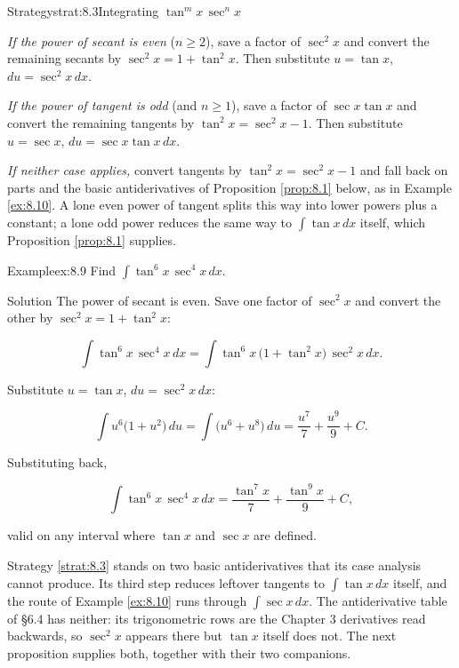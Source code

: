 \documentclass[a4paper,12pt,oneside]{memoir}
\begin{document}
\begin{envstrategy}{Strategy}{strat:8.3}{Integrating \(\tan^m x\,\sec^n x\)}
\begin{steps}
  \item \emph{If the power of secant is even} (\(n \ge 2\)), save a factor of \(\sec^{2}x\) and convert the remaining secants by \(\sec^{2}x = 1 + \tan^{2}x\). Then substitute \(u = \tan x\), \(du = \sec^{2}x\,dx\).
  \item \emph{If the power of tangent is odd} (and \(n \ge 1\)), save a factor of \(\sec x\tan x\) and convert the remaining tangents by \(\tan^{2}x = \sec^{2}x - 1\). Then substitute \(u = \sec x\), \(du = \sec x\tan x\,dx\).
  \item \emph{If neither case applies,} convert tangents by \(\tan^{2}x = \sec^{2}x - 1\) and fall back on parts and the basic antiderivatives of Proposition \ref{prop:8.1} below, as in Example \ref{ex:8.10}. A lone even power of tangent splits this way into lower powers plus a constant; a lone odd power reduces the same way to \(\int\tan x\,dx\) itself, which Proposition \ref{prop:8.1} supplies.
\end{steps}
\end{envstrategy}
\begin{workedexample}
\begin{envexample}{Example}{ex:8.9}{}
Find \(\displaystyle\int \tan^{6}x\,\sec^{4}x\,dx\).
\end{envexample}
\begin{envsolution}{Solution}{}{}
The power of secant is even. Save one factor of \(\sec^{2}x\) and convert the other by \(\sec^{2}x = 1 + \tan^{2}x\):

\[ \int \tan^{6}x\,\sec^{4}x\,dx = \int \tan^{6}x\,\bigl(1 + \tan^{2}x\bigr)\,\sec^{2}x\,dx. \]

Substitute \(u = \tan x\), \(du = \sec^{2}x\,dx\):

\[ \int u^{6}\bigl(1 + u^{2}\bigr)\,du = \int \bigl(u^{6} + u^{8}\bigr)\,du = \frac{u^{7}}{7} + \frac{u^{9}}{9} + C. \]

Substituting back,

\[ \int \tan^{6}x\,\sec^{4}x\,dx = \frac{\tan^{7}x}{7} + \frac{\tan^{9}x}{9} + C, \]

valid on any interval where \(\tan x\) and \(\sec x\) are defined. \qedmark
\end{envsolution}
\end{workedexample}
Strategy \ref{strat:8.3} stands on two basic antiderivatives that its case analysis cannot produce. Its third step reduces leftover tangents to \(\int\tan x\,dx\) itself, and the route of Example \ref{ex:8.10} runs through \(\int\sec x\,dx\). The antiderivative table of §6.4 has neither: its trigonometric rows are the Chapter 3 derivatives read backwards, so \(\sec^{2}x\) appears there but \(\tan x\) itself does not. The next proposition supplies both, together with their two companions.
\end{document}
